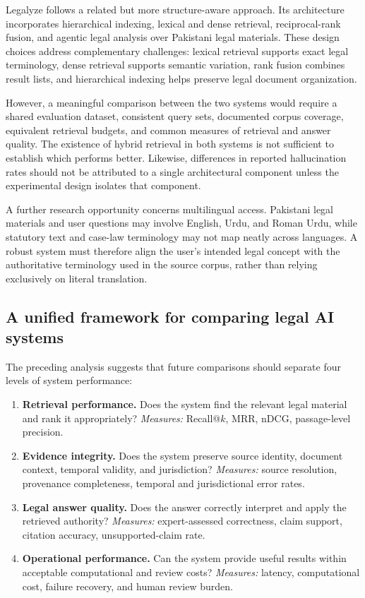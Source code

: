 Legalyze \citep{hamza2026} follows a related but more structure-aware approach. Its architecture
incorporates hierarchical indexing, lexical and dense retrieval, reciprocal-rank fusion, and agentic
legal analysis over Pakistani legal materials. These design choices address complementary challenges:
lexical retrieval supports exact legal terminology, dense retrieval supports semantic variation, rank
fusion combines result lists, and hierarchical indexing helps preserve legal document organization.

However, a meaningful comparison between the two systems would require a shared evaluation dataset,
consistent query sets, documented corpus coverage, equivalent retrieval budgets, and common measures of
retrieval and answer quality. The existence of hybrid retrieval in both systems is not sufficient to
establish which performs better. Likewise, differences in reported hallucination rates should not be
attributed to a single architectural component unless the experimental design isolates that component.

A further research opportunity concerns multilingual access. Pakistani legal materials and user
questions may involve English, Urdu, and Roman Urdu, while statutory text and case-law terminology may
not map neatly across languages. A robust system must therefore align the user's intended legal concept
with the authoritative terminology used in the source corpus, rather than relying exclusively on literal
translation.

\subsection{A unified framework for comparing legal AI systems}

The preceding analysis suggests that future comparisons should separate four levels of system
performance:
\begin{enumerate}[leftmargin=1.4em, itemsep=3pt, topsep=2pt]
\item \textbf{Retrieval performance.} Does the system find the relevant legal material and rank it
appropriately? \textit{Measures:} Recall@$k$, MRR, nDCG, passage-level precision.
\item \textbf{Evidence integrity.} Does the system preserve source identity, document context, temporal
validity, and jurisdiction? \textit{Measures:} source resolution, provenance completeness, temporal and
jurisdictional error rates.
\item \textbf{Legal answer quality.} Does the answer correctly interpret and apply the retrieved
authority? \textit{Measures:} expert-assessed correctness, claim support, citation accuracy,
unsupported-claim rate.
\item \textbf{Operational performance.} Can the system provide useful results within acceptable
computational and review costs? \textit{Measures:} latency, computational cost, failure recovery, and
human review burden.
\end{enumerate}

